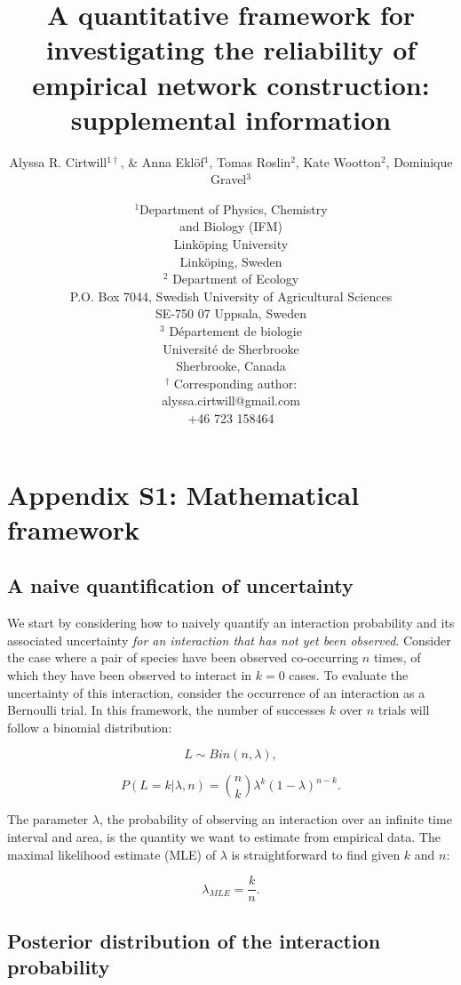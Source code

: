 \documentclass[12pt]{article}
\title{A quantitative framework for investigating the reliability of empirical network construction: supplemental information}
\author{Alyssa R. Cirtwill$^{1\dagger}$, \&  Anna Ekl\"{o}f$^{1}$, Tomas Roslin$^{2}$, Kate Wootton$^{2}$, Dominique Gravel$^{3}$}
\date{\small$^1$Department of Physics, Chemistry\\ 
and Biology (IFM)\\ 
Link\"{o}ping University\\
Link\"{o}ping, Sweden\\
\medskip $^2$ Department of Ecology\\ P.O. Box 7044, Swedish University of Agricultural Sciences \\ SE-750 07 Uppsala, Sweden \\
\medskip$^3$ D\'{e}partement de biologie\\ 
Universit\'{e} de Sherbrooke\\ 
Sherbrooke, Canada\\ 
\medskip
$^\dagger$ Corresponding author:\\
alyssa.cirtwill@gmail.com\\
+46 723 158464\\
}
\begin{document}
 
\maketitle 
\raggedright
\setlength{\parindent}{15pt} 
\clearpage


\section*{Appendix S1: Mathematical framework}

  \subsection*{A naive quantification of uncertainty}

    We start by considering how to naively quantify an interaction probability and its associated uncertainty \emph{for an interaction that has not yet been observed}. Consider the case where a pair of species have been observed co-occurring $n$ times, of which they have been observed to interact in $k = 0$ cases. To evaluate the uncertainty of this interaction, consider the occurrence of an interaction as a Bernoulli trial. In this framework, the number of successes $k$ over $n$ trials will follow a binomial distribution: 
        
        \begin{equation}
          L \sim Bin(n,\lambda) ,
        \end{equation}


        \begin{equation}
           P(L = k|\lambda,n) = {n \choose k}\lambda^k(1-\lambda)^{n-k} . 
           \label{likelihood}
        \end{equation}

    \noindent The parameter $\lambda$, the probability of observing an interaction over an infinite time interval and area, is the quantity we want to estimate from empirical data. 
    The maximal likelihood estimate (MLE) of $\lambda$ is straightforward to find given $k$ and $n$:

        \begin{equation}
          \lambda_{MLE} = \frac{k}{n}  .
          \label{theta_MLE}
        \end{equation}


  \subsection*{Posterior distribution of the interaction probability}
\end{document}
